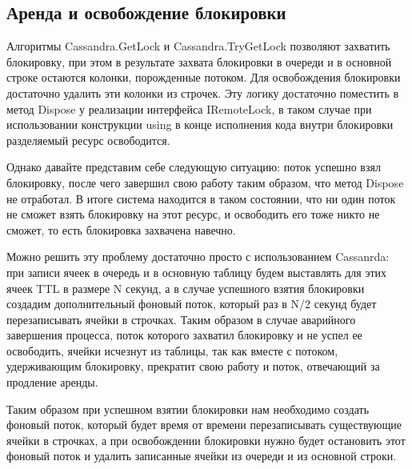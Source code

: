 \subsection{Аренда и освобождение блокировки}

Алгоритмы Cassandra.GetLock и Cassandra.TryGetLock позволяют захватить блокировку, при этом в результате захвата блокировки в очереди и в основной строке остаются колонки, порожденные потоком. Для освобождения блокировки достаточно удалить эти колонки из строчек. Эту логику достаточно поместить в метод Dispose у реализации интерфейса IRemoteLock, в таком случае при использовании конструкции using в конце исполнения кода внутри блокировки разделяемый ресурс освободится.

Однако давайте представим себе следующую ситуацию: поток успешно взял блокировку, после чего завершил свою работу таким образом, что метод Dispose не отработал. В итоге система находится в таком состоянии, что ни один поток не сможет взять блокировку на этот ресурс, и освободить его тоже никто не сможет, то есть блокировка захвачена навечно.

Можно решить эту проблему достаточно просто с использованием Cassanrda: при записи ячеек в очередь и в основную таблицу будем выставлять для этих ячеек TTL в размере N секунд, а в случае успешного взятия блокировки создадим дополнительный фоновый поток, который раз в N/2 секунд будет перезаписывать ячейки в строчках. Таким образом в случае аварийного завершения процесса, поток которого захватил блокировку и не успел ее освободить, ячейки исчезнут из таблицы, так как вместе с потоком, удерживающим блокировку, прекратит свою работу и поток, отвечающий за продление аренды.

Таким образом при успешном взятии блокировки нам необходимо создать фоновый поток, который будет время от времени перезаписывать существующие ячейки в строчках, а при освобождении блокировки нужно будет остановить этот фоновый поток и удалить записанные ячейки из очереди и из основной строки.
